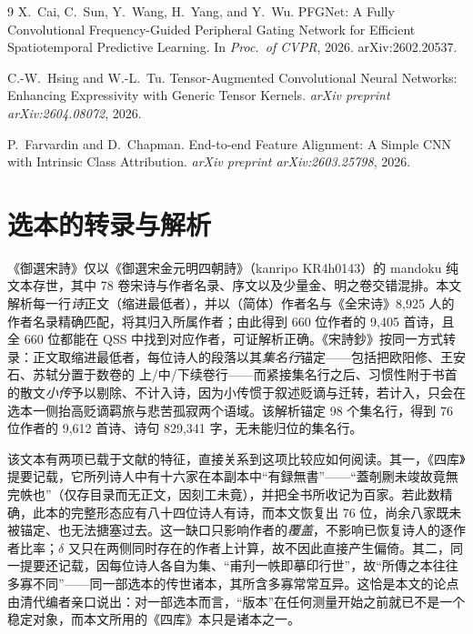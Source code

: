 \documentclass[11pt]{article}
\begin{document}
\begin{thebibliography}{9}
X.~Cai, C.~Sun, Y.~Wang, H.~Yang, and Y.~Wu.
\newblock PFGNet: A Fully Convolutional Frequency-Guided Peripheral Gating
Network for Efficient Spatiotemporal Predictive Learning.
\newblock In \emph{Proc.\ of CVPR}, 2026. arXiv:2602.20537.

C.-W.~Hsing and W.-L.~Tu.
\newblock Tensor-Augmented Convolutional Neural Networks: Enhancing Expressivity
with Generic Tensor Kernels.
\newblock \emph{arXiv preprint arXiv:2604.08072}, 2026.

P.~Farvardin and D.~Chapman.
\newblock End-to-end Feature Alignment: A Simple CNN with Intrinsic Class
Attribution.
\newblock \emph{arXiv preprint arXiv:2603.25798}, 2026.

\end{thebibliography}

\appendix

\section{选本的转录与解析}
\label{app:parse}
《御選宋詩》仅以《御選宋金元明四朝詩》（kanripo KR4h0143）的 mandoku 纯文本存世，其中 78 卷宋诗与作者名录、序文以及少量金、明之卷交错混排。本文解析每一行\emph{诗}正文（缩进最低者），并以（简体）作者名与《全宋诗》8{,}925 人的作者名录精确匹配，将其归入所属作者；由此得到 660 位作者的 9{,}405 首诗，且全 660 位都能在 QSS 中找到对应作者，可证解析正确。《宋詩鈔》按同一方式转录：正文取缩进最低者，每位诗人的段落以其\emph{集名行}锚定——包括把欧阳修、王安石、苏轼分置于数卷的 上/中/下续卷行——而紧接集名行之后、习惯性附于书首的散文\emph{小传}予以剔除、不计入诗，因为小传惯于叙述贬谪与迁转，若计入，只会在选本一侧抬高贬谪羁旅与悲苦孤寂两个语域。该解析锚定 98 个集名行，得到 76 位作者的 9{,}612 首诗、诗句 829{,}341 字，无未能归位的集名行。

该文本有两项已载于文献的特征，直接关系到这项比较应如何阅读。其一，《四库》提要记载，它所列诗人中有十六家在本副本中“有録無書”——“蓋剞劂未竣故竟無完帙也”（仅存目录而无正文，因刻工未竟），并把全书所收记为百家。若此数精确，此本的完整形态应有八十四位诗人有诗，而本文恢复出 76 位，尚余八家既未被锚定、也无法搪塞过去。这一缺口只影响作者的\emph{覆盖}，不影响已恢复诗人的逐作者比率；$\delta$ 又只在两侧同时存在的作者上计算，故不因此直接产生偏倚。其二，同一提要还记载，因每位诗人各自为集、“甫刋一帙即摹印行世”，故“所傳之本往往多寡不同”——同一部选本的传世诸本，其所含多寡常常互异。这恰是本文的论点由清代编者亲口说出：对一部选本而言，“版本”在任何测量开始之前就已不是一个稳定对象，而本文所用的《四库》本只是诸本之一。
\end{document}

